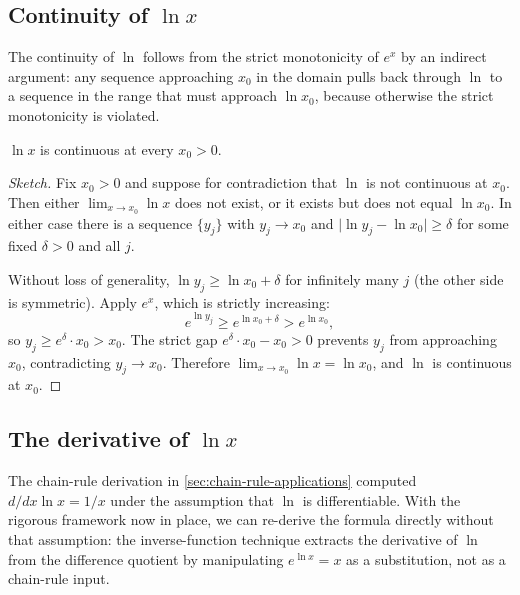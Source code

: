 \subsection{Continuity of \texorpdfstring{$\ln x$}{ln x}}

The continuity of \(\ln\) follows from the strict monotonicity of \(e^{x}\) by an indirect argument: any sequence approaching \(x_{0}\) in the domain pulls back through \(\ln\) to a sequence in the range that must approach \(\ln x_{0}\), because otherwise the strict monotonicity is violated.

\begin{theorem}\label{thm:ln-continuous}
\(\ln x\) is continuous at every \(x_{0} > 0\).
\end{theorem}

\begin{proof}[Sketch]
Fix \(x_{0} > 0\) and suppose for contradiction that \(\ln\) is not continuous at \(x_{0}\). Then either \(\lim_{x \to x_{0}} \ln x\) does not exist, or it exists but does not equal \(\ln x_{0}\). In either case there is a sequence \(\{y_{j}\}\) with \(y_{j} \to x_{0}\) and \(\lvert \ln y_{j} - \ln x_{0} \rvert \geq \delta\) for some fixed \(\delta > 0\) and all \(j\).

Without loss of generality, \(\ln y_{j} \geq \ln x_{0} + \delta\) for infinitely many \(j\) (the other side is symmetric). Apply \(e^{x}\), which is strictly increasing:
\[
e^{\ln y_{j}} \geq e^{\ln x_{0} + \delta} > e^{\ln x_{0}},
\]
so \(y_{j} \geq e^{\delta} \cdot x_{0} > x_{0}\). The strict gap \(e^{\delta} \cdot x_{0} - x_{0} > 0\) prevents \(y_{j}\) from approaching \(x_{0}\), contradicting \(y_{j} \to x_{0}\). Therefore \(\lim_{x \to x_{0}} \ln x = \ln x_{0}\), and \(\ln\) is continuous at \(x_{0}\).
\end{proof}

\subsection{The derivative of \texorpdfstring{$\ln x$}{ln x}}

The chain-rule derivation in \cref{sec:chain-rule-applications} computed \(d/dx \ln x = 1/x\) under the assumption that \(\ln\) is differentiable. With the rigorous framework now in place, we can re-derive the formula directly without that assumption: the inverse-function technique extracts the derivative of \(\ln\) from the difference quotient by manipulating \(e^{\ln x} = x\) as a substitution, not as a chain-rule input.

